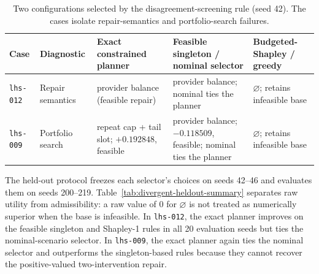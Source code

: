 \documentclass[review]{elsarticle}
\theoremstyle{plain}
\theoremstyle{definition}
\theoremstyle{remark}
\begin{document}
\begin{table}[t]
\caption{Two configurations selected by the disagreement-screening rule (seed 42). The cases isolate repair-semantics and portfolio-search failures.}\label{tab:divergent-diagnostics}
\centering
\scriptsize
\setlength{\tabcolsep}{4pt}
\begin{tabularx}{\textwidth}{@{}p{}p{}X X X@{}}
\toprule
Case & Diagnostic & Exact constrained planner & Feasible singleton / nominal selector & Budgeted-Shapley / greedy\\
\midrule
\texttt{lhs-012} & Repair semantics & provider balance (feasible repair) & provider balance; nominal ties the planner & $\varnothing$; retains infeasible base\\
\texttt{lhs-009} & Portfolio search & repeat cap + tail slot; $+0.192848$, feasible & provider balance; $-0.118509$, feasible; nominal ties the planner & $\varnothing$; retains infeasible base\\
\bottomrule
\end{tabularx}
\end{table}

The held-out protocol freezes each selector's choices on seeds 42--46 and evaluates them on seeds 200--219. Table~\ref{tab:divergent-heldout-summary} separates raw utility from admissibility: a raw value of $0$ for $\varnothing$ is not treated as numerically superior when the base is infeasible. In \texttt{lhs-012}, the exact planner improves on the feasible singleton and Shapley-1 rules in all 20 evaluation seeds but ties the nominal-scenario selector. In \texttt{lhs-009}, the exact planner again ties the nominal selector and outperforms the singleton-based rules because they cannot recover the positive-valued two-intervention repair.
\end{document}
